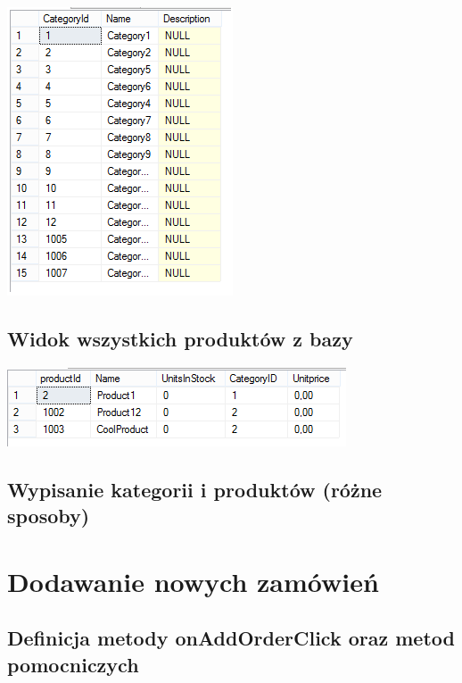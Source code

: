 \documentclass[a4paper, 11pt]{article}
\begin{document}
     \begin{center}
        \includegraphics{images/SelectFromCategory.png}
    \end{center}
    
    \subsection{Widok wszystkich produktów z bazy}

    \begin{center}
        \includegraphics{images/SelectProduct.png}
    \end{center}
    
    \newpage
    
    \subsection{Wypisanie kategorii i produktów (różne sposoby)}
    
    

    

    \newpage
    
    \section{Dodawanie nowych zamówień}
    
    \subsection{Definicja metody onAddOrderClick oraz metod pomocniczych}
    
\end{document}
